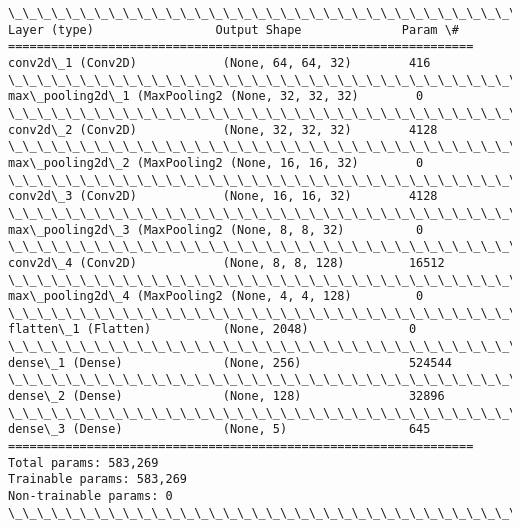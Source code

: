 \documentclass[11pt]{article}
\begin{document}
    \begin{Verbatim}[commandchars=\\\{\}]
\_\_\_\_\_\_\_\_\_\_\_\_\_\_\_\_\_\_\_\_\_\_\_\_\_\_\_\_\_\_\_\_\_\_\_\_\_\_\_\_\_\_\_\_\_\_\_\_\_\_\_\_\_\_\_\_\_\_\_\_\_\_\_\_\_
Layer (type)                 Output Shape              Param \#   
=================================================================
conv2d\_1 (Conv2D)            (None, 64, 64, 32)        416       
\_\_\_\_\_\_\_\_\_\_\_\_\_\_\_\_\_\_\_\_\_\_\_\_\_\_\_\_\_\_\_\_\_\_\_\_\_\_\_\_\_\_\_\_\_\_\_\_\_\_\_\_\_\_\_\_\_\_\_\_\_\_\_\_\_
max\_pooling2d\_1 (MaxPooling2 (None, 32, 32, 32)        0         
\_\_\_\_\_\_\_\_\_\_\_\_\_\_\_\_\_\_\_\_\_\_\_\_\_\_\_\_\_\_\_\_\_\_\_\_\_\_\_\_\_\_\_\_\_\_\_\_\_\_\_\_\_\_\_\_\_\_\_\_\_\_\_\_\_
conv2d\_2 (Conv2D)            (None, 32, 32, 32)        4128      
\_\_\_\_\_\_\_\_\_\_\_\_\_\_\_\_\_\_\_\_\_\_\_\_\_\_\_\_\_\_\_\_\_\_\_\_\_\_\_\_\_\_\_\_\_\_\_\_\_\_\_\_\_\_\_\_\_\_\_\_\_\_\_\_\_
max\_pooling2d\_2 (MaxPooling2 (None, 16, 16, 32)        0         
\_\_\_\_\_\_\_\_\_\_\_\_\_\_\_\_\_\_\_\_\_\_\_\_\_\_\_\_\_\_\_\_\_\_\_\_\_\_\_\_\_\_\_\_\_\_\_\_\_\_\_\_\_\_\_\_\_\_\_\_\_\_\_\_\_
conv2d\_3 (Conv2D)            (None, 16, 16, 32)        4128      
\_\_\_\_\_\_\_\_\_\_\_\_\_\_\_\_\_\_\_\_\_\_\_\_\_\_\_\_\_\_\_\_\_\_\_\_\_\_\_\_\_\_\_\_\_\_\_\_\_\_\_\_\_\_\_\_\_\_\_\_\_\_\_\_\_
max\_pooling2d\_3 (MaxPooling2 (None, 8, 8, 32)          0         
\_\_\_\_\_\_\_\_\_\_\_\_\_\_\_\_\_\_\_\_\_\_\_\_\_\_\_\_\_\_\_\_\_\_\_\_\_\_\_\_\_\_\_\_\_\_\_\_\_\_\_\_\_\_\_\_\_\_\_\_\_\_\_\_\_
conv2d\_4 (Conv2D)            (None, 8, 8, 128)         16512     
\_\_\_\_\_\_\_\_\_\_\_\_\_\_\_\_\_\_\_\_\_\_\_\_\_\_\_\_\_\_\_\_\_\_\_\_\_\_\_\_\_\_\_\_\_\_\_\_\_\_\_\_\_\_\_\_\_\_\_\_\_\_\_\_\_
max\_pooling2d\_4 (MaxPooling2 (None, 4, 4, 128)         0         
\_\_\_\_\_\_\_\_\_\_\_\_\_\_\_\_\_\_\_\_\_\_\_\_\_\_\_\_\_\_\_\_\_\_\_\_\_\_\_\_\_\_\_\_\_\_\_\_\_\_\_\_\_\_\_\_\_\_\_\_\_\_\_\_\_
flatten\_1 (Flatten)          (None, 2048)              0         
\_\_\_\_\_\_\_\_\_\_\_\_\_\_\_\_\_\_\_\_\_\_\_\_\_\_\_\_\_\_\_\_\_\_\_\_\_\_\_\_\_\_\_\_\_\_\_\_\_\_\_\_\_\_\_\_\_\_\_\_\_\_\_\_\_
dense\_1 (Dense)              (None, 256)               524544    
\_\_\_\_\_\_\_\_\_\_\_\_\_\_\_\_\_\_\_\_\_\_\_\_\_\_\_\_\_\_\_\_\_\_\_\_\_\_\_\_\_\_\_\_\_\_\_\_\_\_\_\_\_\_\_\_\_\_\_\_\_\_\_\_\_
dense\_2 (Dense)              (None, 128)               32896     
\_\_\_\_\_\_\_\_\_\_\_\_\_\_\_\_\_\_\_\_\_\_\_\_\_\_\_\_\_\_\_\_\_\_\_\_\_\_\_\_\_\_\_\_\_\_\_\_\_\_\_\_\_\_\_\_\_\_\_\_\_\_\_\_\_
dense\_3 (Dense)              (None, 5)                 645       
=================================================================
Total params: 583,269
Trainable params: 583,269
Non-trainable params: 0
\_\_\_\_\_\_\_\_\_\_\_\_\_\_\_\_\_\_\_\_\_\_\_\_\_\_\_\_\_\_\_\_\_\_\_\_\_\_\_\_\_\_\_\_\_\_\_\_\_\_\_\_\_\_\_\_\_\_\_\_\_\_\_\_\_

    \end{Verbatim}
\end{document}
